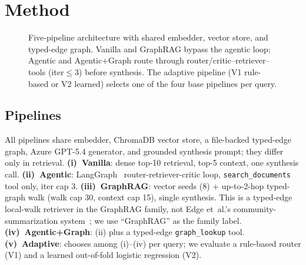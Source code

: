\section{Method}
\label{sec:method}

\begin{figure}[t!]
  \centering
  \resizebox{0.74\columnwidth}{!}{}%
  \caption{Five-pipeline architecture with shared embedder, vector store,
    and typed-edge graph. Vanilla and GraphRAG bypass the agentic loop;
    Agentic and Agentic+Graph route through router/critic--retriever--tools
    (iter${\leq}3$) before synthesis. The adaptive pipeline (V1 rule-based
    or V2 learned) selects one of the four base pipelines per query.}
  \label{fig:architecture}
\end{figure}

\subsection{Pipelines}
\label{sec:pipelines}
All pipelines share embedder, ChromaDB vector store, a file-backed
typed-edge graph, Azure GPT-5.4 generator, and grounded synthesis prompt; they
differ only in retrieval. \textbf{(i)~Vanilla}: dense top-10 retrieval,
top-5 context, one synthesis call. \textbf{(ii)~Agentic}: LangGraph~\cite{langgraph_software}
router-retriever-critic loop, \texttt{search\_documents} tool only, iter
cap 3. \textbf{(iii)~GraphRAG}: vector seeds (8) + up-to-2-hop typed-graph
walk (walk cap 30, context cap 15), single synthesis. This
is a typed-edge local-walk retriever in the GraphRAG family, not Edge
et~al.'s community-summarization system~\cite{graphrag2024}; we use
``GraphRAG'' as the family label. \textbf{(iv)~Agentic+Graph}: (ii) plus
a typed-edge \texttt{graph\_lookup} tool. \textbf{(v)~Adaptive}: chooses
among (i)--(iv) per query; we evaluate a rule-based router (V1) and a
learned out-of-fold logistic regression (V2).

